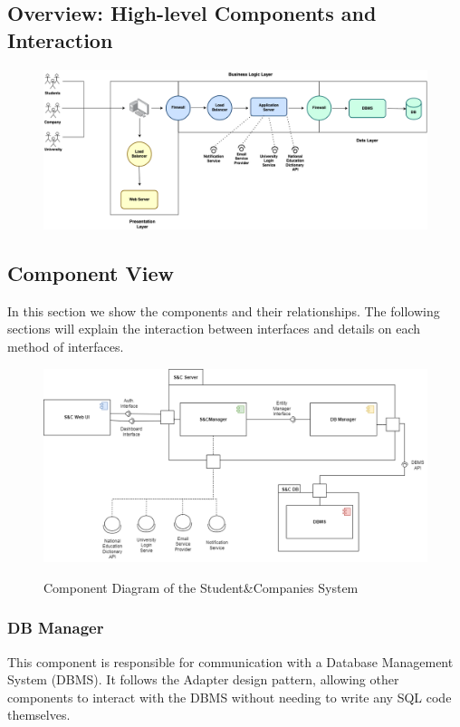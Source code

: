 \documentclass[a4paper,12pt]{article}
\begin{document}
\subsection{Overview: High-level Components and Interaction}
\begin{figure}[H]
\centering
\includegraphics[scale = 0.40]{DD_figures/SingleDiagrams/overviewDiagram.png}
\end{figure}
\subsection{Component View}
In this section we show the components and their relationships. The following
sections will explain the interaction between interfaces and details on each method of interfaces.
\begin{figure}[H]
\centering
\includegraphics[scale = 0.50]{DD_figures/GeneralComponentDiagram.drawio.png}\\
\caption{Component Diagram of the Student\&Companies System}
\end{figure}

\subsubsection{DB Manager}
This component is responsible for communication with a Database Management System (DBMS).
It follows the Adapter design pattern, allowing other components to interact with the DBMS
without needing to write any SQL code themselves.
\end{document}
